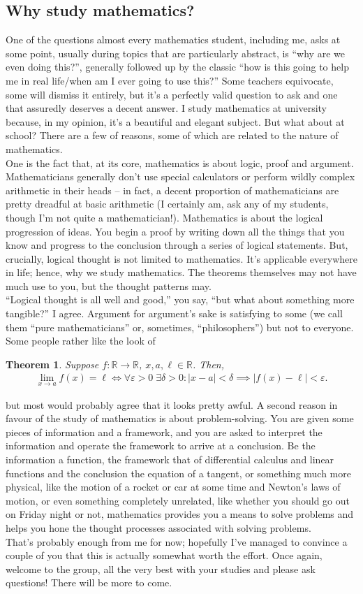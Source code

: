 \documentclass[a4paper,11pt]{article}
\newcommand{\abs}[1]{\left|#1\right|}
\newcommand{\R}{\mathbb{R}}
\newtheorem*{theorem*}{Theorem}
\begin{document}
	\subsection*{Why study mathematics?}
	One of the questions almost every mathematics student, including me, asks at some point, usually during topics that are particularly abstract, is ``why are we even doing this?'', generally followed up by the classic ``how is this going to help me in real life/when am I ever going to use this?'' Some teachers equivocate, some will dismiss it entirely, but it's a perfectly valid question to ask and one that assuredly deserves a decent answer. I study mathematics at university because, in my opinion, it's a beautiful and elegant subject. But what about at school? There are a few of reasons, some of which are related to the nature of mathematics. \\
	
	\noindent One is the fact that, at its core, mathematics is about logic, proof and argument. Mathematicians generally don't use special calculators or perform wildly complex arithmetic in their heads --  in fact, a decent proportion of mathematicians are pretty dreadful at basic arithmetic (I certainly am, ask any of my students, though I'm not quite a mathematician!). Mathematics is about the logical progression of ideas. You begin a proof by writing down all the things that you know and progress to the conclusion through a series of logical statements. But, crucially, logical thought is not limited to mathematics. It's applicable everywhere in life; hence, why we study mathematics. The theorems themselves may not have much use to you, but the thought patterns may.\\
	
	\noindent ``Logical thought is all well and good,'' you say, ``but what about something more tangible?'' I agree. Argument for argument's sake is satisfying to some (we call them ``pure mathematicians'' or, sometimes, ``philosophers'') but not to everyone. Some people rather like the look of
	\begin{theorem*}
		Suppose $f:\R\to\R$, $x,a,\ell\in\R$. Then,
		\begin{align*}
		\lim_{x\to a}f(x) = \ell \iff \forall\varepsilon>0\;\exists\delta>0:\abs{x-a}<\delta\implies\abs{f(x)-\ell}<\varepsilon.
		\end{align*}
	\end{theorem*}
	\noindent but most would probably agree that it looks pretty awful. A second reason in favour of the study of mathematics is about problem-solving. You are given some pieces of information and a framework, and you are asked to interpret the information and operate the framework to arrive at a conclusion. Be the information a function, the framework that of differential calculus and linear functions and the conclusion the equation of a tangent, or something much more physical, like the motion of a rocket or car at some time and Newton's laws of motion, or even something completely unrelated, like whether you should go out on Friday night or not, mathematics provides you a means to solve problems and helps you hone the thought processes associated with solving problems.\\
	
	\noindent That's probably enough from me for now; hopefully I've managed to convince a couple of you that this is actually somewhat worth the effort. Once again, welcome to the group, all the very best with your studies and please ask questions! There will be more to come.
\end{document}
